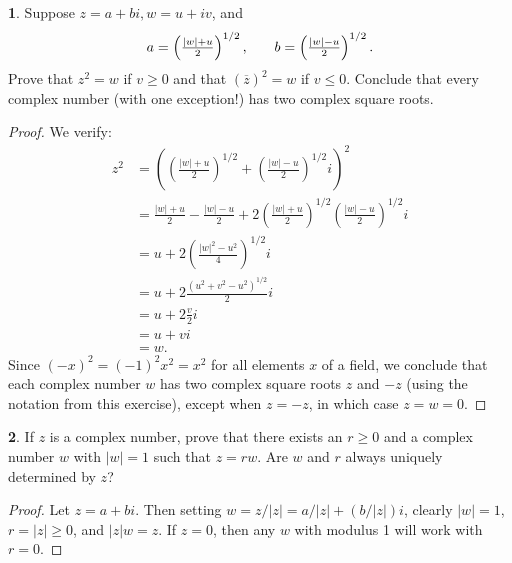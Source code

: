 \documentclass[12pt]{article}
\theoremstyle{definition}
\newtheorem{ex}{}
\begin{document}
\begin{ex}
	Suppose $z = a + bi, w = u + iv$, and \begin{equation*}
		\begin{array}{c@{\qquad}c}
			a = \left( \frac{|w| + u}{2} \right)^{1/2}, & b = \left( \frac{|w| - u}{2} \right)^{1/2}.
		\end{array}
	\end{equation*}
	Prove that $z^2 = w$ if $v \geq 0$ and that $(\overline{z})^2 = w$ if $v \leq 0$.
	Conclude that every complex number (with one exception!) has two complex square roots.
\end{ex}
\begin{proof}
	We verify: \begin{align*}
		z^2 & =\left( \left( \frac{|w| + u}{2} \right)^{1 / 2} + \left( \frac{|w| - u}{2} \right)^{1/2}i\right)^2                        \\
		    & = \frac{|w| + u}{2}  - \frac{|w| - u}{2} + 2\left( \frac{|w| + u}{2} \right)^{1/2} \left( \frac{|w| - u}{2} \right)^{1/2}i \\
		    & = u + 2 \left( \frac{|w|^2 - u^2}{4} \right)^{1/2}i                                                                        \\
		    & = u + 2 \frac{\left( u^2 + v^2 - u^2\right)^{1/2}}{2} i                                                                    \\
		    & = u + 2 \frac{v}{2} i                                                                                                      \\
		    & = u + v i                                                                                                                  \\
		    & = w.
	\end{align*}
	Since $(-x)^2 = (-1)^2x^2 = x^2$ for all elements $x$ of a field, we conclude that each complex number $w$ has two complex square roots $z$ and $-z$ (using the notation from this exercise), except when $z = -z$, in which case $z = w = 0$.
\end{proof}

\begin{ex}
	If $z$ is a complex number, prove that there exists an $r \geq 0$ and a complex number $w$ with $|w| = 1$ such that $z = rw$.
	Are $w$ and $r$ always uniquely determined by $z$?
\end{ex}
\begin{proof}
	Let $z = a + bi$.
	Then setting $w = z/|z| = a/|z| + (b/|z|)i$, clearly $|w| = 1$, $r = |z| \geq 0$, and $|z|w = z$.
	If $z = 0$, then any $w$ with modulus 1 will work with $r = 0$.
\end{proof}
\end{document}
